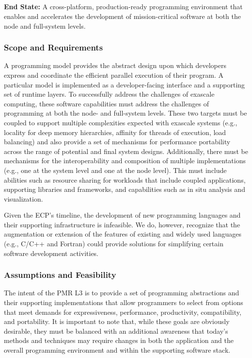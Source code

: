 \subsection{  \pmr}\label{subsect:pmr}

\textbf{End State:} A cross-platform, production-ready programming environment that enables and accelerates the development of mission-critical software at both the node and full-system levels.

\subsubsection{Scope and Requirements}
A programming model provides the abstract design upon which developers express and coordinate the efficient parallel execution of their program. A particular model is implemented as a developer-facing interface and a supporting set of runtime layers. To successfully address the challenges of exascale computing, these software capabilities must address the challenges of programming at both the node- and full-system levels. These two targets must be coupled to support multiple complexities expected with exascale systems (e.g., locality for deep memory hierarchies, affinity for threads of execution, load balancing) and also provide a set of mechanisms for performance portability across the range of potential and final system designs. Additionally, there must be mechanisms for the interoperability and composition of multiple implementations (e.g., one at the system level and one at the node level). This must include abilities such as resource sharing for workloads that include coupled applications, supporting libraries and frameworks, and capabilities such as in situ analysis and visualization. 

Given the ECP’s timeline, the development of new programming languages and their supporting infrastructure is infeasible. We do, however, recognize that the augmentation or extension of the features of existing and widely used languages (e.g., C/C++ and Fortran) could provide solutions for simplifying certain software development activities. 

\subsubsection{Assumptions and Feasibility}
The intent of the PMR L3 is to provide a set of programming abstractions and their supporting implementations that allow programmers to select from options that meet demands for expressiveness, performance, productivity, compatibility, and portability. It is important to note that, while these goals are obviously desirable, they must be balanced with an additional awareness that today’s methods and techniques may require changes in both the application and the overall programming environment and within the supporting software stack.

